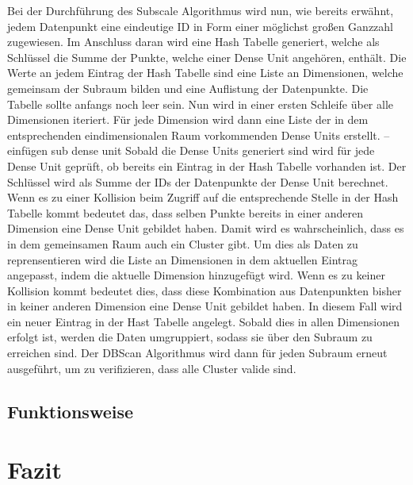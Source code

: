 \documentclass[utf8,biblatex]{lni}
\begin{document}
Bei der Durchführung des Subscale Algorithmus wird nun, wie bereits erwähnt, jedem Datenpunkt eine eindeutige ID in Form einer möglichst großen Ganzzahl zugewiesen. 
Im Anschluss daran wird eine Hash Tabelle generiert, welche als Schlüssel die Summe der Punkte, welche einer Dense Unit angehören, enthält. 
Die Werte an jedem Eintrag der Hash Tabelle sind eine Liste an Dimensionen, welche gemeinsam der Subraum bilden und eine Auflistung der Datenpunkte. 
Die Tabelle sollte anfangs noch leer sein. 
Nun wird in einer ersten Schleife über alle Dimensionen iteriert. 
Für jede Dimension wird dann eine Liste der in dem entsprechenden eindimensionalen Raum vorkommenden Dense Units erstellt. 
--einfügen sub dense unit
Sobald die Dense Units generiert sind wird für jede Dense Unit geprüft, ob bereits ein Eintrag in der Hash Tabelle vorhanden ist. 
Der Schlüssel wird als Summe der IDs der Datenpunkte der Dense Unit berechnet. 
Wenn es zu einer Kollision beim Zugriff auf die entsprechende Stelle in der Hash Tabelle kommt bedeutet das, dass selben Punkte bereits in einer anderen Dimension eine Dense Unit gebildet haben. 
Damit wird es wahrscheinlich, dass es in dem gemeinsamen Raum auch ein Cluster gibt. 
Um dies als Daten zu reprensentieren wird die Liste an Dimensionen in dem aktuellen Eintrag angepasst, indem die aktuelle Dimension hinzugefügt wird. 
Wenn es zu keiner Kollision kommt bedeutet dies, dass diese Kombination aus Datenpunkten bisher in keiner anderen Dimension eine Dense Unit gebildet haben. 
In diesem Fall wird ein neuer Eintrag in der Hast Tabelle angelegt. 
Sobald dies in allen Dimensionen erfolgt ist, werden die Daten umgruppiert, sodass sie über den Subraum zu erreichen sind. 
Der DBScan Algorithmus wird dann für jeden Subraum erneut ausgeführt, um zu verifizieren, dass alle Cluster valide sind. 

\subsection{Funktionsweise}
\section{Fazit}



\printbibliography
\end{document}
